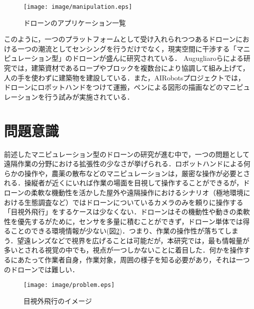 \begin{figure}[htbp]
 \begin{center}
  \texttt{[image: image/manipulation.eps]}
 \end{center}
 \caption{ドローンのアプリケーション一覧 \cite{application}}
 \label{application}
\end{figure} 

このように，一つのプラットフォームとして受け入れられつつあるドローンにおける一つの潮流としてセンシングを行うだけでなく，現実空間に干渉する「マニピュレーション型」のドローンが盛んに研究されている．
Augugliaroらによる研究では\cite{augugliaro2014flight}\cite{augugliaro2014flight}，建築資材であるロープやブロックを複数台により協調して組み上げて，人の手を使わずに建築物を建設している．また，AIRobotsプロジェクトでは\cite{marconi2012aerial}，ドローンにロボットハンドをつけて運搬，ペンによる図形の描画などのマニピュレーションを行う試みが実施されている．

\section{問題意識}
前述したマニピュレーション型のドローンの研究が進む中で，一つの問題として遠隔作業の分野における拡張性の少なさが挙げられる．ロボットハンドによる何らかの操作や，農薬の散布などのマニピュレーションは，厳密な操作が必要とされる．操縦者が近くにいれば作業の場面を目視して操作することができるが，ドローンの柔軟な機動性を活かした屋外や遠隔操作におけるシナリオ（極地環境における生態調査など）ではドローンについているカメラのみを頼りに操作する「目視外飛行」をするケースは少なくない．ドローンはその機動性や動きの柔軟性を優先するがために，センサを多量に積むことができず，ドローン単体では得ることのできる環境情報が少ない(図\ref{problem})．つまり、作業の操作性が落ちてしまう．望遠レンズなどで視界を広げることは可能だが，本研究では，最も情報量が多いとされる視覚の中でも，視点が一つしかないことに着目した．何かを操作するにあたって作業者自身，作業対象，周囲の様子を知る必要があり，それは一つのドローンでは難しい．

\begin{figure}[htbp]
 \begin{center}
  \texttt{[image: image/problem.eps]}
 \end{center}
 \caption{目視外飛行のイメージ\cite{problem}}
 \label{problem}
\end{figure} 


